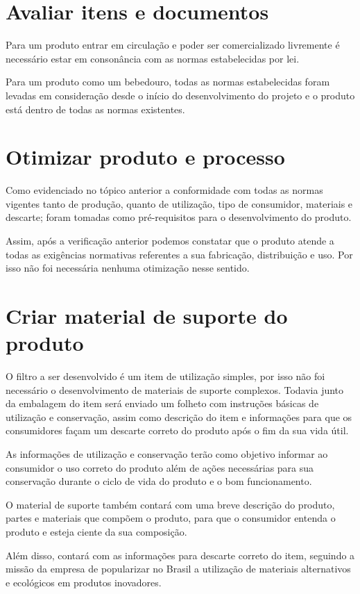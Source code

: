 \documentclass[
	12pt,				%
	openright,			%
	oneside,			%
	a4paper,			%
	english,			%
	french,				%
	spanish,			%
	brazil				%
	]{abntex2}
\begin{document}
\section{Avaliar itens e documentos}

Para um produto entrar em circulação e poder ser comercializado livremente é necessário estar em consonância com as normas estabelecidas por lei.

Para um produto como um bebedouro, todas as normas estabelecidas foram levadas em consideração desde o início do desenvolvimento do projeto e o produto está dentro de todas as normas existentes.


\section{Otimizar produto e processo}

Como evidenciado no tópico anterior a conformidade com todas as normas vigentes tanto de produção, quanto de utilização, tipo de consumidor, materiais e descarte; foram tomadas como pré-requisitos para o desenvolvimento do produto.

Assim, após a verificação anterior podemos constatar que o produto atende a todas as exigências normativas referentes a sua fabricação, distribuição e uso. Por isso não foi necessária nenhuma otimização nesse sentido.


\section{Criar material de suporte do produto}

O filtro a ser desenvolvido é um item de utilização simples, por isso não foi necessário o desenvolvimento de materiais de suporte complexos. Todavia junto da embalagem do item será enviado um folheto com instruções básicas de utilização e conservação, assim como descrição do item e informações para que os consumidores façam um descarte correto do produto após o fim da sua vida útil.

As informações de utilização e conservação terão como objetivo informar ao consumidor o uso correto do produto além de ações necessárias para sua conservação durante o ciclo de vida do produto e o bom funcionamento.

O material de suporte também contará com uma breve descrição do produto, partes e materiais que compõem o produto, para que o consumidor entenda o produto e esteja ciente da sua composição.

Além disso, contará com as informações para descarte correto do item, seguindo a missão da empresa de popularizar no Brasil a utilização de materiais alternativos e ecológicos em produtos inovadores.
\end{document}
